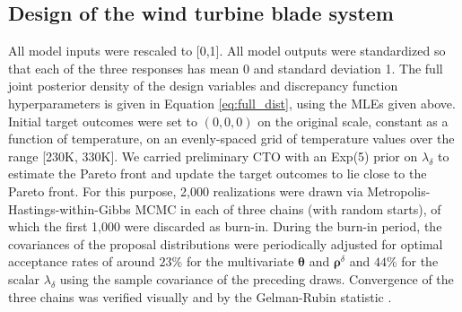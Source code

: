 \documentclass[12pt]{article}
\begin{document}
\subsection{Design of the wind turbine blade system}\label{the_model}
%
All model inputs were rescaled to [0,1]. 
%
All model outputs were standardized so that each of the three responses has mean 0 and standard deviation 1.
%
The full joint posterior density of the design variables and discrepancy function hyperparameters is given in Equation \eqref{eq:full_dist}, using the MLEs given above.
%
Initial target outcomes were set to $(0,0,0)$ on the original scale, constant as a function of temperature, on an evenly-spaced grid of temperature values over the range [230K, 330K].
%
We carried preliminary CTO with an Exp(5) prior on $\lambda_\delta$ to estimate the Pareto front and update the target outcomes to lie close to the Pareto front. %
%
For this purpose, 2,000 realizations were drawn via Metropolis-Hastings-within-Gibbs MCMC \citep{Metropolis1953, Hastings1970, Geman1984} in each of three chains (with random starts), of which the first 1,000 were discarded as burn-in. 
%
During the burn-in period, the covariances of the proposal distributions were periodically adjusted for optimal acceptance rates of around $23\%$ for the multivariate $\boldsymbol \theta$ and $\boldsymbol\rho^\delta$ \citep{Roberts1997} and $44\%$ for the scalar $\lambda_\delta$ \citep[][p. 296]{Gelman2013} using the sample covariance of the preceding draws. %
%
%
%
Convergence of the three chains was verified visually and by the Gelman-Rubin statistic \citep[$\approx1.01$;][]{Gelman1992a}.
%
\end{document}

